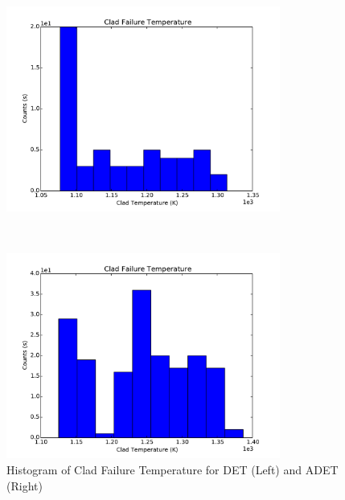 \begin{figure}[h]
 \begin{minipage}[b]{8.5cm}
   \centering
   \includegraphics[width=9cm]{figures/HistogramSampledVarCladFailureDET_histogram.pdf}
 \end{minipage}
 \ \hspace{2mm} \hspace{3mm} \
 \begin{minipage}[b]{8.5cm}
   \centering
   \includegraphics[width=9cm]{figures/HistogramSampledVarCladFailureADET_histogram.pdf}
 \end{minipage}
\caption{Histogram of Clad Failure Temperature for DET (Left) and ADET (Right)}
\label{fig:SampledTEMP}
\end{figure}

